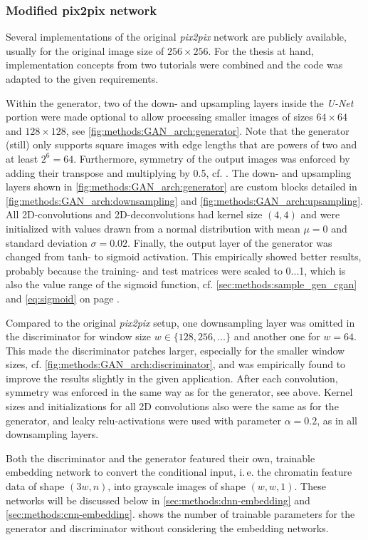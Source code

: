 \subsubsection{Modified pix2pix network}\label{sec:methods:cGAN_initial}
Several implementations of the original \emph{pix2pix} network \cite{Isola2017} are publicly available, usually for the original image size of $256\times256$.
For the thesis at hand, implementation concepts from two tutorials \cite{tfpix2pix2020, brownlee2019} were combined and the code was adapted to the given requirements.

Within the generator, two of the down- and upsampling layers inside the \emph{U-Net} portion were made optional 
to allow processing smaller images of sizes $64\times64$ and $128\times128$, see \cref{fig:methods:GAN_arch:generator}.
Note that the generator (still) only supports square images with edge lengths that are powers of two and at least $2^6=64$.
Furthermore, symmetry of the output images was enforced by adding their transpose and multiplying by 0.5, cf. \cite{Fudenberg2020}.
The down- and upsampling layers shown in  \cref{fig:methods:GAN_arch:generator} are custom blocks 
detailed in \cref{fig:methods:GAN_arch:downsampling} and \ref{fig:methods:GAN_arch:upsampling}. 
All 2D-convolutions and 2D-deconvolutions had kernel size $(4,4)$ and were initialized with values drawn from a normal distribution with mean $\mu=0$ and
standard deviation $\sigma=0.02$.
Finally, the output layer of the generator was changed from tanh- to sigmoid activation.
This empirically showed better results, probably because the training- and test matrices were scaled to 0...1, which 
is also the value range of the sigmoid function, cf. \cref{sec:methods:sample_gen_cgan} and \cref{eq:sigmoid} on page \pageref{eq:sigmoid}.

Compared to the original \emph{pix2pix} setup, 
one downsampling layer was omitted in the discriminator for window size $w\in\{128,256,\dots\}$ and another one for $w=64$.
This made the discriminator patches larger, especially for the smaller window sizes,
cf. \cref{fig:methods:GAN_arch:discriminator}, and was empirically found to improve the results
slightly in the given application.
After each convolution, symmetry was enforced in the same way as for the generator, see above.
Kernel sizes and initializations for all 2D convolutions also were the same as for the generator,
and leaky \acrshort{relu}-activations were used with parameter $\alpha=0.2$, as in all downsampling layers.

Both the discriminator and the generator featured their own, trainable embedding network
to convert the conditional input, i.\,e. the chromatin feature data of shape $(3w, n)$,
into grayscale images of shape $(w,w,1)$. 
These networks will be discussed below in \cref{sec:methods:dnn-embedding}
and \cref{sec:methods:cnn-embedding}.
 shows the number of trainable parameters
for the generator and discriminator without considering the embedding networks.

